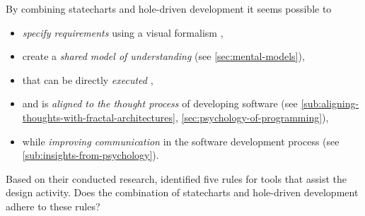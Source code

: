 By combining statecharts and hole-driven development it seems possible to
\begin{itemize}
    \item \emph{specify requirements} using a visual formalism \autocite{leveson_experiences_1991},
    \item create a \emph{shared model of understanding} (see \cref{sec:mental-models}),
    \item that can be directly \emph{executed} \autocite{harel_statecharts:_1987},
    \item and is \emph{aligned to the thought process} of developing software (see \cref{sub:aligning-thoughts-with-fractal-architectures}, \cref{sec:psychology-of-programming}),
    \item while \emph{improving communication} in the software development process (see \cref{sub:insights-from-psychology}).
\end{itemize}
Based on their conducted research, \textcite{visser_expert_1990} identified five rules for tools that assist the design activity.
Does the combination of statecharts and hole-driven development adhere to these rules?



